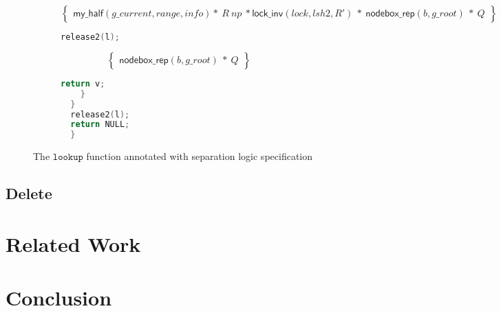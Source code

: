 \documentclass[acmsmall,screen]{acmart}\settopmatter{printfolios=true}
\begin{document}
\begin{figure}[htp]
\begin{subfigure}[t]{1\textwidth}
$$\left\{\begin{array}{l} \mathsf{my\_half}(g\_current,range,info)*\ R\ np\ *\mathsf{lock\_inv}(lock,lsh2,R')\ *\ \mathsf{nodebox\_rep}(b,g\_root)\ *\ Q\end{array}\right\}$$
 \vspace*{-10pt}
        \begin{lstlisting}[language = C]
      release2(l);
         \end{lstlisting}
       $$\left\{\begin{array}{l} \mathsf{nodebox\_rep}(b,g\_root)\ *\ Q\end{array}\right\}$$
        \vspace*{-10pt}
         \begin{lstlisting}[language = C]
       return v;
    }
  }
  release2(l);
  return NULL;
  }
 \end{lstlisting} 
\end{subfigure}
\caption{The $\texttt{lookup}$ function annotated with separation logic specification}
\label{lookupproof}
\end{figure} 

\subsection{Delete}

\section{Related Work}
\section{Conclusion}
\end{document}
